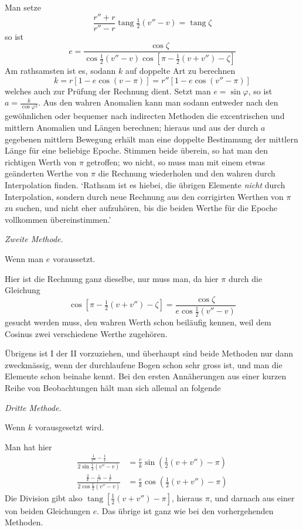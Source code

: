 Man setze
\[
\frac{r''+r}{r''-r}\operatorname{tang}\tfrac12(v''-v)=\operatorname{tang}\zeta
\]
so ist
\[
e=\frac{\cos\zeta}{\cos\tfrac12(v''-v)\cos[\pi-\tfrac12(v+v'')-\zeta]}
\]
Am rathsamsten ist es, sodann $k$ auf doppelte Art zu berechnen
\[
k=r[1-e\cos(v-\pi)]=r''[1-e\cos(v''-\pi)]
\]
welches auch zur Prüfung der Rechnung dient. Setzt man $e=\sin\varphi$, so ist $a=\frac{k}{\cos\varphi^2}$. Aus den wahren Anomalien kann man sodann entweder nach den gewöhnlichen oder bequemer nach indirecten Methoden die excentrischen und mittlern Anomalien und Längen berechnen; hieraus und aus der durch $a$ gegebenen mittlern Bewegung erhält man eine doppelte Bestimmung der mittlern Länge für eine beliebige Epoche. Stimmen beide überein, so hat man den richtigen Werth von $\pi$ getroffen; wo nicht, so muss man mit einem etwas geänderten Werthe von $\pi$ die Rechnung wiederholen und den wahren durch Interpolation finden. ‘Rathsam ist es hiebei, die übrigen Elemente \emph{nicht} durch Interpolation, sondern durch neue Rechnung aus den corrigirten Werthen von $\pi$ zu suchen, und nicht eher aufzuhören, bis die beiden Werthe für die Epoche vollkommen übereinstimmen.’
%
\par\medskip\emph{Zweite Methode.}\par
Wenn man $e$ voraussetzt.

Hier ist die Rechnung ganz dieselbe, nur muss man, da hier $\pi$ durch die Gleichung
\[
\cos[\pi-\tfrac12(v+v'')-\zeta]=\frac{\cos\zeta}{e\cos\tfrac12(v''-v)}
\]
gesucht werden muss, den wahren Werth schon beiläufig kennen, weil dem Cosinus zwei verschiedene Werthe zugehören.

Übrigens ist I der II vorzuziehen, und überhaupt sind beide Methoden nur dann zweckmässig, wenn der durchlaufene Bogen schon sehr gross ist, und man die Elemente schon beinahe kennt. Bei den ersten Annäherungen aus einer kurzen Reihe von Beobachtungen hält man sich allemal an folgende

\par\medskip\emph{Dritte Methode.}\par
Wenn $k$ vorausgesetzt wird.

Man hat hier
\[
\begin{aligned}
\frac{\frac1{r''}-\frac1r}{2\sin\tfrac12(v''-v)}&=\frac ek\sin(\tfrac12(v+v'')-\pi)\\
\frac{\frac2k-\frac1{r''}-\frac1r}{2\cos\tfrac12(v''-v)}&=\frac ek\cos(\tfrac12(v+v'')-\pi)
\end{aligned}
\]
Die Division gibt also $\operatorname{tang}[\tfrac12(v+v'')-\pi]$, hieraus $\pi$, und darnach aus einer von beiden Gleichungen $e$. Das übrige ist ganz wie bei den vorhergehenden Methoden.


